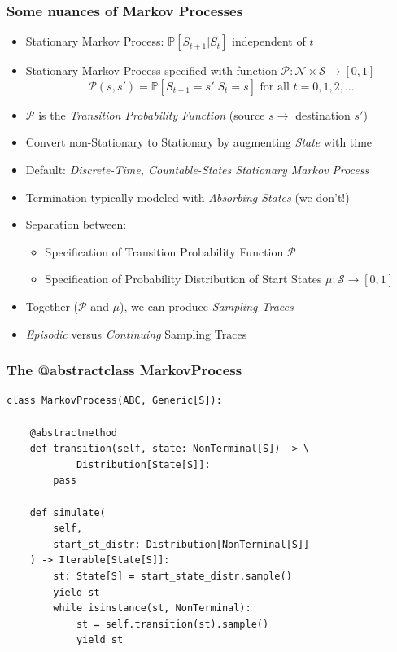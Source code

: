 \documentclass[handout]{beamer}
\begin{document}
\begin{frame}
\frametitle{Some nuances of Markov Processes}
\pause
\begin{itemize}[<+->]
\item Stationary Markov Process: $\mathbb{P}[S_{t+1}|S_t]$ independent of $t$
\item Stationary Markov Process specified with function $\mathcal{P}: \mathcal{N} \times \mathcal{S} \rightarrow [0,1]$
$$\mathcal{P}(s, s') = \mathbb{P}[S_{t+1}=s'|S_t=s] \text{ for all } t = 0, 1, 2, \ldots$$
\item $\mathcal{P}$ is the {\em Transition Probability Function} (source $s \rightarrow$ destination $s'$)
\item Convert non-Stationary to Stationary by augmenting {\em State} with time
\item Default: {\em Discrete-Time, Countable-States Stationary Markov Process}
\item Termination typically modeled with {\em Absorbing States} (we don't!)
\item Separation between:
\begin{itemize}
\item Specification of Transition Probability Function $\mathcal{P}$
\item Specification of Probability Distribution of Start States $\mu: \mathcal{S} \rightarrow [0, 1]$ 
\end{itemize}
\item Together ($\mathcal{P}$ and $\mu$), we can produce {\em Sampling Traces}
\item {\em Episodic} versus {\em Continuing} Sampling Traces
\end{itemize}
\end{frame}

\begin{frame}[fragile]
\frametitle{The @abstractclass MarkovProcess}
\pause
\begin{lstlisting}
class MarkovProcess(ABC, Generic[S]):

    @abstractmethod
    def transition(self, state: NonTerminal[S]) -> \
            Distribution[State[S]]:
        pass

    def simulate(
        self,
        start_st_distr: Distribution[NonTerminal[S]]
    ) -> Iterable[State[S]]:
        st: State[S] = start_state_distr.sample()
        yield st
        while isinstance(st, NonTerminal):
            st = self.transition(st).sample()
            yield st
\end{lstlisting}
\end{frame}
\end{document}
